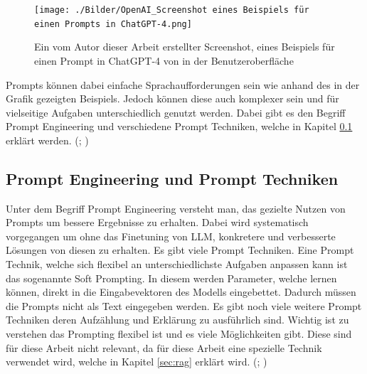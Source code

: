 \documentclass[12pt,toc=bib,toc=listof]{scrreprt}
\begin{document}
\begin{figure} [H]
    \centering
    \texttt{[image: ./Bilder/OpenAI\_Screenshot eines Beispiels für einen Prompts in ChatGPT-4.png]}
    \caption{Ein vom Autor dieser Arbeit erstellter Screenshot, eines Beispiels für einen Prompt in ChatGPT-4 von \textcite{OpenAI2025} in der Benutzeroberfläche}
    \label{fig:enter-label}
\end{figure}

\noindent Prompts können dabei einfache Sprachaufforderungen sein wie anhand des in der Grafik gezeigten Beispiels. Jedoch können diese auch komplexer sein und für vielseitige Aufgaben unterschiedlich genutzt werden. Dabei gibt es den Begriff Prompt Engineering und verschiedene Prompt Techniken, welche in Kapitel \ref{sec:promptEngineeringUndPromptTechniken} erklärt werden. (\cite{Gu2023}; \cite{Liu2023})
\newpage

\subsection{Prompt Engineering und Prompt Techniken} %
\label{sec:promptEngineeringUndPromptTechniken}
Unter dem Begriff Prompt Engineering versteht man, das gezielte Nutzen von Prompts um bessere Ergebnisse zu erhalten. Dabei wird systematisch vorgegangen um ohne das Finetuning von LLM, konkretere und verbesserte Lösungen von diesen zu erhalten. Es gibt viele Prompt Techniken. Eine Prompt Technik, welche sich flexibel an unterschiedlichste Aufgaben anpassen kann ist das sogenannte Soft Prompting. In diesem werden Parameter, welche lernen können, direkt in die Eingabevektoren des Modells eingebettet. Dadurch müssen die Prompts nicht als Text eingegeben werden. Es gibt noch viele weitere Prompt Techniken deren Aufzählung und Erklärung zu ausführlich sind. Wichtig ist zu verstehen das Prompting flexibel ist und es viele Möglichkeiten gibt. Diese sind für diese Arbeit nicht relevant, da für diese Arbeit eine spezielle Technik verwendet wird, welche in Kapitel \ref{sec:rag} erklärt wird. (\cite{Gu2023}; \cite{Liu2023})
\end{document}

